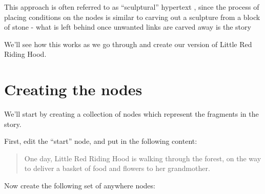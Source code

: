 \documentclass{article}
\begin{document}
This approach is often referred to as ``sculptural'' hypertext
\cite{Bernstein:2001aa,Bernstein:2002aa}, since the process of placing
conditions on the nodes is similar to carving out a sculpture from a block of
stone - what is left behind once unwanted links are carved away is the story

We'll see how this works as we go through and create our version of Little
Red Riding Hood. 

\section{Creating the nodes}
We'll start by creating a collection of nodes which represent the fragments in
the story.

First, edit the ``start'' node, and put in the following content:

\begin{quotation}
One day, Little Red Riding Hood is walking through the forest, on the way to
deliver a basket of food and flowers to her grandmother. 
\end{quotation}

Now create the following set of anywhere nodes:
\end{document}
